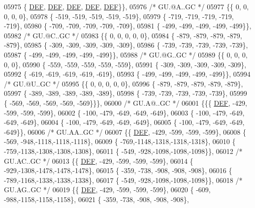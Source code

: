 \begin{DoxyCode}
05975 \{  \mbox{\hyperlink{1_88_84__epars_8h_a397419fc12b37ed479c8abb9d444d843}{DEF}},  \mbox{\hyperlink{1_88_84__epars_8h_a397419fc12b37ed479c8abb9d444d843}{DEF}},  \mbox{\hyperlink{1_88_84__epars_8h_a397419fc12b37ed479c8abb9d444d843}{DEF}},  \mbox{\hyperlink{1_88_84__epars_8h_a397419fc12b37ed479c8abb9d444d843}{DEF}},  \mbox{\hyperlink{1_88_84__epars_8h_a397419fc12b37ed479c8abb9d444d843}{DEF}}\}\},
05976 \textcolor{comment}{/* GU.@A..GC */}
05977 \{\{    0,    0,    0,    0,    0\},
05978 \{ -519, -519, -519, -519, -519\},
05979 \{ -719, -719, -719, -719, -719\},
05980 \{ -709, -709, -709, -709, -709\},
05981 \{ -499, -499, -499, -499, -499\}\},
05982 \textcolor{comment}{/* GU.@C..GC */}
05983 \{\{    0,    0,    0,    0,    0\},
05984 \{ -879, -879, -879, -879, -879\},
05985 \{ -309, -309, -309, -309, -309\},
05986 \{ -739, -739, -739, -739, -739\},
05987 \{ -499, -499, -499, -499, -499\}\},
05988 \textcolor{comment}{/* GU.@G..GC */}
05989 \{\{    0,    0,    0,    0,    0\},
05990 \{ -559, -559, -559, -559, -559\},
05991 \{ -309, -309, -309, -309, -309\},
05992 \{ -619, -619, -619, -619, -619\},
05993 \{ -499, -499, -499, -499, -499\}\},
05994 \textcolor{comment}{/* GU.@U..GC */}
05995 \{\{    0,    0,    0,    0,    0\},
05996 \{ -879, -879, -879, -879, -879\},
05997 \{ -389, -389, -389, -389, -389\},
05998 \{ -739, -739, -739, -739, -739\},
05999 \{ -569, -569, -569, -569, -569\}\}\},
06000 \textcolor{comment}{/* GU.A@..GC */}
06001 \{\{\{  \mbox{\hyperlink{1_88_84__epars_8h_a397419fc12b37ed479c8abb9d444d843}{DEF}}, -429, -599, -599, -599\},
06002 \{ -100, -479, -649, -649, -649\},
06003 \{ -100, -479, -649, -649, -649\},
06004 \{ -100, -479, -649, -649, -649\},
06005 \{ -100, -479, -649, -649, -649\}\},
06006 \textcolor{comment}{/* GU.AA..GC */}
06007 \{\{  \mbox{\hyperlink{1_88_84__epars_8h_a397419fc12b37ed479c8abb9d444d843}{DEF}}, -429, -599, -599, -599\},
06008 \{ -569, -948,-1118,-1118,-1118\},
06009 \{ -769,-1148,-1318,-1318,-1318\},
06010 \{ -759,-1138,-1308,-1308,-1308\},
06011 \{ -549, -928,-1098,-1098,-1098\}\},
06012 \textcolor{comment}{/* GU.AC..GC */}
06013 \{\{  \mbox{\hyperlink{1_88_84__epars_8h_a397419fc12b37ed479c8abb9d444d843}{DEF}}, -429, -599, -599, -599\},
06014 \{ -929,-1308,-1478,-1478,-1478\},
06015 \{ -359, -738, -908, -908, -908\},
06016 \{ -789,-1168,-1338,-1338,-1338\},
06017 \{ -549, -928,-1098,-1098,-1098\}\},
06018 \textcolor{comment}{/* GU.AG..GC */}
06019 \{\{  \mbox{\hyperlink{1_88_84__epars_8h_a397419fc12b37ed479c8abb9d444d843}{DEF}}, -429, -599, -599, -599\},
06020 \{ -609, -988,-1158,-1158,-1158\},
06021 \{ -359, -738, -908, -908, -908\},

\end{DoxyCode}
